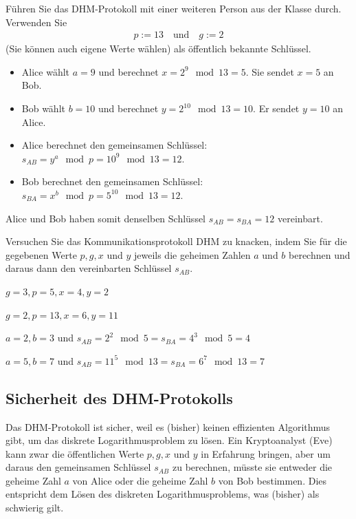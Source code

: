 \begin{myexercise}
	Führen Sie das \gls{DHM}-Protokoll mit einer weiteren Person aus der Klasse durch. Verwenden Sie
	\begin{align*}
		p := 13 \quad \text{und}\quad g := 2
	\end{align*}
	(Sie können auch eigene Werte wählen) als öffentlich bekannte Schlüssel.
	\begin{myanswer}
		\begin{itemize}
			\item Alice wählt $a = 9$ und berechnet $x = 2^9 \mod 13 = 5$. Sie sendet $x = 5$ an Bob.
			\item Bob wählt $b = 10$ und berechnet $y = 2^{10} \mod 13 = 10$. Er sendet $y = 10$ an Alice.
			\item Alice berechnet den gemeinsamen Schlüssel: $s_{AB} = y^a \mod p = 10^9 \mod 13 = 12$.
			\item Bob berechnet den gemeinsamen Schlüssel: $s_{BA} = x^b \mod p = 5^{10} \mod 13 = 12$.
		\end{itemize}
		Alice und Bob haben somit denselben Schlüssel $s_{AB} = s_{BA} = 12$ vereinbart.
	\end{myanswer}
\end{myexercise}

\begin{myexercise}
	Versuchen Sie das Kommunikationsprotokoll \gls{DHM} zu knacken, indem Sie
	für die gegebenen Werte $p, g, x$ und $y$ jeweils die geheimen Zahlen $a$ und $b$ berechnen und daraus
	dann den vereinbarten Schlüssel $s_{AB}$.
	\begin{aenum}
		\item $g = 3, p = 5, x = 4, y = 2$
		\item $g = 2, p = 13, x = 6, y = 11$
	\end{aenum}
	\begin{myanswer}
		\begin{aenum}
			\item $a = 2, b = 3$ und $s_{AB} = 2^{2}\mod 5 = s_{BA} = 4^3 \mod 5 = 4$
			\item $a = 5, b = 7$ und $s_{AB} = 11^5 \mod 13 = s_{BA} = 6^7 \mod 13 = 7$
		\end{aenum}
	\end{myanswer}
\end{myexercise}

\subsection*{Sicherheit des \gls{DHM}-Protokolls}
Das \gls{DHM}-Protokoll ist sicher, weil es (bisher) keinen effizienten Algorithmus gibt, um das diskrete Logarithmusproblem zu lösen. Ein Kryptoanalyst (Eve) kann zwar die öffentlichen Werte $p, g, x$ und $y$ in Erfahrung bringen, aber um daraus den gemeinsamen Schlüssel $s_{AB}$ zu berechnen, müsste sie entweder die geheime Zahl $a$ von Alice oder die geheime Zahl $b$ von Bob bestimmen. Dies entspricht dem Lösen des diskreten Logarithmusproblems, was (bisher) als schwierig gilt.


